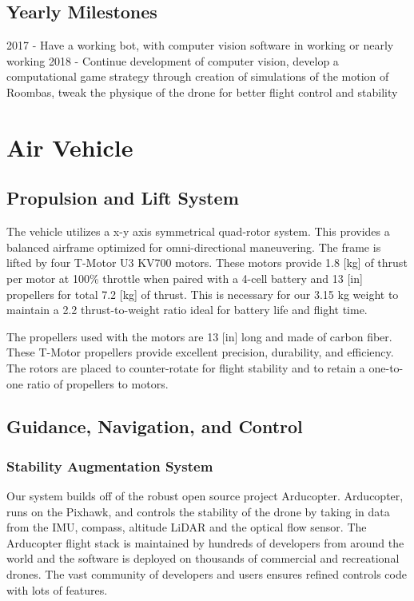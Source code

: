 \documentclass[12pt,letterpaper]{article}
\begin{document}
	\subsection*{Yearly Milestones}
	2017 - Have a working bot, with computer vision software in working or nearly working
	2018 - Continue development of computer vision, develop a computational game strategy through creation of simulations of the motion of Roombas, tweak the physique of the drone for better flight control and stability


\section*{Air Vehicle}
	\subsection*{Propulsion and Lift System}
			The vehicle utilizes a x-y axis symmetrical quad-rotor system. This provides a balanced airframe optimized for omni-directional maneuvering. The frame is lifted by four T-Motor U3 KV700 motors. These motors provide 1.8 [kg] of thrust per motor at 100\% throttle when paired with a 4-cell battery and 13 [in] propellers for total 7.2 [kg] of thrust. This is necessary for our 3.15 kg weight to maintain a 2.2 thrust-to-weight ratio ideal for battery life and flight time.

			The propellers used with the motors are 13 [in] long and made of carbon fiber. These T-Motor propellers provide excellent precision, durability, and efficiency. The rotors are placed to counter-rotate for flight stability and to retain a one-to-one ratio of propellers to motors.


	\subsection*{Guidance, Navigation, and Control}
		\subsubsection*{Stability Augmentation System}
			Our system builds off of the robust open source project Arducopter. Arducopter, runs on the Pixhawk, and controls the stability of the drone by taking in data from the IMU, compass, altitude LiDAR and the optical flow sensor. The Arducopter flight stack is maintained by hundreds of developers from around the world and the software is deployed on thousands of commercial and recreational drones. The vast community of developers and users ensures refined controls code with lots of features.
\end{document}
